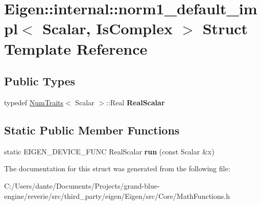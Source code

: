 \hypertarget{struct_eigen_1_1internal_1_1norm1__default__impl}{}\section{Eigen\+::internal\+::norm1\+\_\+default\+\_\+impl$<$ Scalar, Is\+Complex $>$ Struct Template Reference}
\label{struct_eigen_1_1internal_1_1norm1__default__impl}
\subsection*{Public Types}
\begin{DoxyCompactItemize}
\item 
\mbox{\label{struct_eigen_1_1internal_1_1norm1__default__impl_a42d266cb237f6bf97932ee32bfced0fc}} 
typedef \mbox{\hyperlink{struct_eigen_1_1_num_traits}{Num\+Traits}}$<$ Scalar $>$\+::Real {\bfseries Real\+Scalar}
\end{DoxyCompactItemize}
\subsection*{Static Public Member Functions}
\begin{DoxyCompactItemize}
\item 
\mbox{\label{struct_eigen_1_1internal_1_1norm1__default__impl_a0a85b5cd11f3899778537f2f744e0df1}} 
static E\+I\+G\+E\+N\+\_\+\+D\+E\+V\+I\+C\+E\+\_\+\+F\+U\+NC Real\+Scalar {\bfseries run} (const Scalar \&x)
\end{DoxyCompactItemize}


The documentation for this struct was generated from the following file\+:\begin{DoxyCompactItemize}
\item 
C\+:/\+Users/dante/\+Documents/\+Projects/grand-\/blue-\/engine/reverie/src/third\+\_\+party/eigen/\+Eigen/src/\+Core/Math\+Functions.\+h\end{DoxyCompactItemize}
